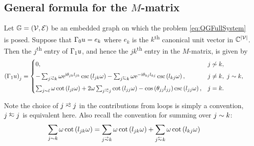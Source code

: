 \subsection{General formula for the $M$-matrix} \label{ssec:MMatrixResult}
\begin{prop} \label{prop:M-MatrixEntries}
	Let $\mathbb{G}=\left( \mathcal{V},\mathcal{E} \right)$ be an embedded graph on which the problem \eqref{eq:QGFullSystem} is posed.
	Suppose that $\Gamma_0 u = e_k$ where $e_k$ is the $k$\textsuperscript{th} canonical unit vector in $\mathbb{C}^{\left\lvert \mathcal{V} \right\rvert}$.
	Then the $j$\textsuperscript{th} entry of $\Gamma_1 u$, and hence the $jk$\textsuperscript{th} entry in the $M$-matrix, is given by
	\begin{align*}
		\bracs{\nmap u}_j &= 
		\begin{cases}
			0,	
			& j \not\con k, \\[5pt]
			-\sum_{j\conLeft k} \omega \e^{\rmi\qm_{jk}l_{jk}} \csc\bracs{l_{jk}\omega} 
			- \sum_{j\conRight k} \omega \e^{-\rmi\qm_{kj}l_{kj}} \csc\bracs{l_{kj}\omega},
			& j\neq k, \ j\con k, \\[5pt]
			\sum_{j\con l} \omega\cot\bracs{l_{jl}\omega}
			+ 2\omega\sum_{j\conLeft j} \cot\bracs{l_{jj}\omega} - \cos\bracs{\qm_{jj}l_{jj}}\csc\bracs{l_{jj}\omega},
			& j=k.
		\end{cases}
	\end{align*}
\end{prop}
Note the choice of $j\conLeft j$ in the contributions from loops is simply a convention, $j\conRight j$ is equivalent here.
Also recall the convention for summing over $j\sim k$:
\begin{align*}
	\sum_{j\con k} \omega\cot\bracs{l_{jk}\omega} &= \sum_{j\conLeft k} \omega\cot\bracs{l_{jk}\omega}	+ \sum_{j\conRight k} \omega\cot\bracs{l_{kj}\omega}
\end{align*}
